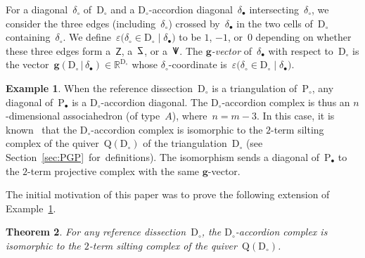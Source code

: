 \documentclass{amsart}
\newtheorem{theorem}{Theorem}%
\theoremstyle{definition}
\newtheorem{example}[theorem]{Example}
\newcommand{\R}{\mathbb{R}} %
\renewcommand{\b}[1]{\mathbf{#1}} %
\newcommand{\bigset}[2]{\big\{ #1 \;\big|\; #2 \big\}} %
\newcommand{\eqdef}{\mbox{\,\raisebox{0.2ex}{\scriptsize\ensuremath{\mathrm:}}\ensuremath{=}\,}} %
\newcommand{\darkblue}{\color{darkblue}} %
\newcommand{\defn}[1]{\textsl{\darkblue #1}} %
\newcommand{\polygon}{\mathrm{P}} %
\newcommand{\dissection}{\mathrm{D}} %
\newcommand{\sign}[3]{\varepsilon \big( {#1} \in {#2}\;|\;{#3} \big)} %
\newcommand{\SSS}{\reflectbox{$\mathsf{Z}$}} %
\newcommand{\ZZZ}{\mathsf{Z}} %
\newcommand{\VVV}{{\mathsf{{V \hspace{-.1686cm} I\,}}}} %
\newcommand{\gvector}[2]{\mathbf{g}(#1 \,|\, #2)} %
\newcommand{\biggvectors}[2]{\mathbf{g} \big( #1 \,|\, #2 \big)} %
\newcommand{\gvectorFan}{\mathcal{F}^\mathbf{g}} %
\newcommand{\quiver}{\mathrm{Q}} %
\begin{document}

For a diagonal~$\delta_\circ$ of~$\dissection_\circ$ and a $\dissection_\circ$-accordion diagonal~$\delta_\bullet$ intersecting~$\delta_\circ$, we consider the three edges (including~$\delta_\circ$) crossed by~$\delta_\bullet$ in the two cells of~$\dissection_\circ$ containing~$\delta_\circ$. We define~$\sign{\delta_\circ}{\dissection_\circ}{\delta_\bullet}$ to be $1$, $-1$, or~$0$ depending on whether these three edges form a~$\ZZZ$, a~$\SSS$, or a~$\VVV$.
The \defn{$\b{g}$-vector} of~$\delta_\bullet$ with respect to~$\dissection_\circ$ is the vector~$\gvector{\dissection_\circ}{\delta_\bullet} \in \R^{\dissection_\circ}$ whose $\delta_\circ$-coordinate is~$\sign{\delta_\circ}{\dissection_\circ}{\delta_\bullet}$.

\begin{example}
\label{exm:associahedron}
When the reference dissection~$\dissection_\circ$ is a triangulation of~$\polygon_\circ$, any diagonal of~$\polygon_\bullet$ is a $\dissection_\circ$-accordion diagonal.
The $\dissection_\circ$-accordion complex is thus an $n$-dimensional associahedron (of type~$A$), where~$n = m-3$.
In this case, it is known~\cite{??} that the $\dissection_\circ$-accordion complex is isomorphic to the $2$-term silting complex of the quiver~$\quiver(\dissection_\circ)$ of the triangulation~$\dissection_\circ$ (see Section~\ref{sec:PGP}~for~definitions).
The isomorphism sends a diagonal of~$\polygon_\bullet$ to the $2$-term projective complex with the same $\b{g}$-vector.
\end{example}

The initial motivation of this paper was to prove the following extension of Example~\ref{exm:associahedron}.

\begin{theorem}
\label{thm:bijectionAccordionComplexSiltingComplex}
For any reference dissection~$\dissection_\circ$, the $\dissection_\circ$-accordion complex is isomorphic to the $2$-term silting complex of the quiver~$\quiver(\dissection_\circ)$.
\end{theorem}
\end{document}

